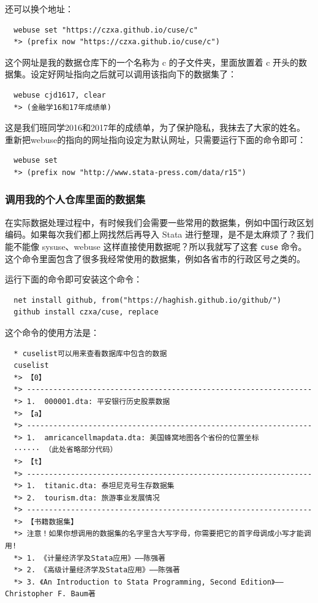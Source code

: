 \documentclass[cn,fancy,blue,11pt]{elegantbook}
\begin{document}
还可以换个地址：

\begin{lstlisting}
  webuse set "https://czxa.github.io/cuse/c"
  *> (prefix now "https://czxa.github.io/cuse/c")
\end{lstlisting}

这个网址是我的数据仓库下的一个名称为 c 的子文件夹，里面放置着 c 开头的数据集。设定好网址指向之后就可以调用该指向下的数据集了：

\begin{lstlisting}
  webuse cjd1617, clear
  *> (金融学16和17年成绩单)
\end{lstlisting}

这是我们班同学2016和2017年的成绩单，为了保护隐私，我抹去了大家的姓名。
重新把webuse的指向的网址指向设定为默认网址，只需要运行下面的命令即可：

\begin{lstlisting}
  webuse set
  *> (prefix now "http://www.stata-press.com/data/r15")
\end{lstlisting}

\subsubsection{调用我的个人仓库里面的数据集}
在实际数据处理过程中，有时候我们会需要一些常用的数据集，例如中国行政区划编码。如果每次我们都上网找然后再导入 Stata 进行整理，是不是太麻烦了？我们能不能像 sysuse、webuse 这样直接使用数据呢？所以我就写了这套 \lstinline{cuse} 命令。这个命令里面包含了很多我经常使用的数据集，例如各省市的行政区号之类的。

运行下面的命令即可安装这个命令：

\begin{lstlisting}
  net install github, from("https://haghish.github.io/github/")
  github install czxa/cuse, replace
\end{lstlisting}

这个命令的使用方法是：

\begin{lstlisting}
  * cuselist可以用来查看数据库中包含的数据
  cuselist
  *> 【0】
  *> -----------------------------------------------------------------
  *> 1.  000001.dta: 平安银行历史股票数据
  *> 【a】
  *> -----------------------------------------------------------------
  *> 1.  amricancellmapdata.dta: 美国蜂窝地图各个省份的位置坐标
  ······ （此处省略部分代码）
  *> 【t】
  *> -----------------------------------------------------------------
  *> 1.  titanic.dta: 泰坦尼克号生存数据集
  *> 2.  tourism.dta: 旅游事业发展情况
  *> -----------------------------------------------------------------
  *> 【书籍数据集】
  *> 注意！如果你想调用的数据集的名字里含大写字母，你需要把它的首字母调成小写才能调用!
  *> 1. 《计量经济学及Stata应用》——陈强著
  *> 2. 《高级计量经济学及Stata应用》——陈强著
  *> 3. 《An Introduction to Stata Programming, Second Edition》——Christopher F. Baum著
\end{lstlisting}
\end{document}
